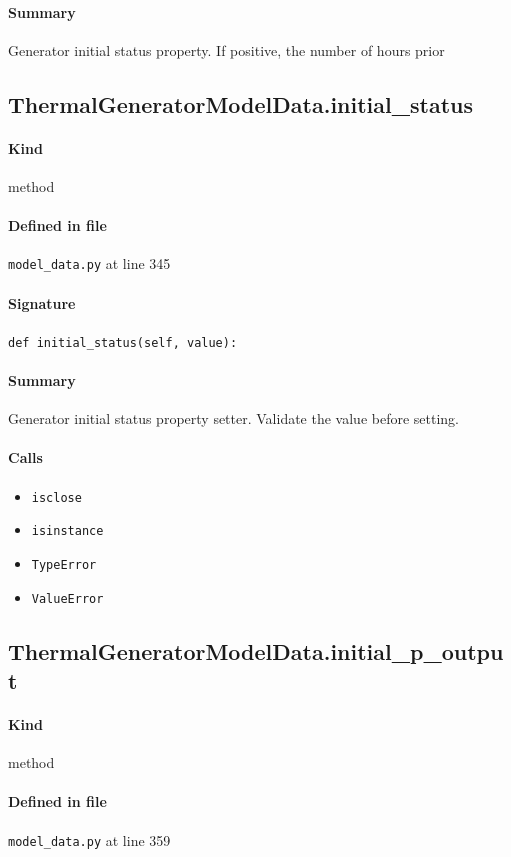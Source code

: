\documentclass[11pt]{report}
\begin{document}
\paragraph{Summary} Generator initial status property. If positive, the number of hours prior
\subsection{ThermalGeneratorModelData.initial\_status}
\label{def:model_data.py:ThermalGeneratorModelData.initial_status:L345}
\paragraph{Kind} method
\paragraph{Defined in file} \texttt{model\_data.py} at line 345
\paragraph{Signature} \texttt{def initial\_status(self, value):}
\paragraph{Summary} Generator initial status property setter. Validate the value before setting.
\paragraph{Calls}
\begin{itemize}[leftmargin=*]
  \item \texttt{isclose}
  \item \texttt{isinstance}
  \item \texttt{TypeError}
  \item \texttt{ValueError}
\end{itemize}
\subsection{ThermalGeneratorModelData.initial\_p\_output}
\label{def:model_data.py:ThermalGeneratorModelData.initial_p_output:L359}
\paragraph{Kind} method
\paragraph{Defined in file} \texttt{model\_data.py} at line 359
\end{document}
